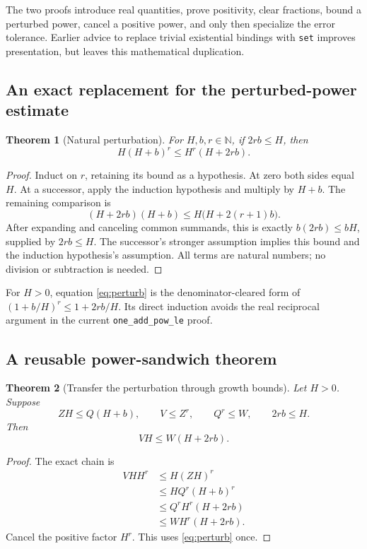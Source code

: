 \documentclass[11pt,a4paper]{article}
\newcommand{\N}{\mathbb N}
\newcommand{\code}[1]{\nolinkurl{#1}}
\newtheorem{theorem}{Theorem}[section]
\begin{document}
The two proofs introduce real quantities, prove positivity, clear fractions,
bound a perturbed power, cancel a positive power, and only then specialize the
error tolerance. Earlier advice to replace trivial existential bindings with
\code{set} improves presentation, but leaves this mathematical duplication.

\subsection{An exact replacement for the perturbed-power estimate}

\begin{theorem}[Natural perturbation]
For \(H,b,r\in\N\), if \(2rb\le H\), then
\begin{equation}
 H(H+b)^r\le H^r(H+2rb).
 \label{eq:perturb}
\end{equation}
\end{theorem}
\begin{proof}
Induct on \(r\), retaining its bound as a hypothesis. At zero both sides equal
\(H\). At a successor, apply the induction hypothesis and multiply by \(H+b\).
The remaining comparison is
\[
 (H+2rb)(H+b)\le H\bigl(H+2(r+1)b\bigr).
\]
After expanding and canceling common summands, this is exactly
\(b(2rb)\le bH\), supplied by \(2rb\le H\). The successor's stronger
assumption implies this bound and the induction hypothesis's assumption.
All terms are natural numbers; no division or subtraction is needed.
\end{proof}

For \(H>0\), equation \eqref{eq:perturb} is the denominator-cleared form of
\((1+b/H)^r\le 1+2rb/H\). Its direct induction avoids the real reciprocal
argument in the current \code{one_add_pow_le} proof.

\subsection{A reusable power-sandwich theorem}

\begin{theorem}[Transfer the perturbation through growth bounds]
Let \(H>0\). Suppose
\[
 ZH\le Q(H+b),\qquad V\le Z^r,\qquad Q^r\le W,
 \qquad 2rb\le H.
\]
Then
\begin{equation}
 VH\le W(H+2rb).
 \label{eq:sandwich}
\end{equation}
\end{theorem}
\begin{proof}
The exact chain is
\begin{align*}
 VH H^r
 &\le H(ZH)^r\\
 &\le H Q^r(H+b)^r\\
 &\le Q^r H^r(H+2rb)\\
 &\le W H^r(H+2rb).
\end{align*}
Cancel the positive factor \(H^r\). This uses \eqref{eq:perturb} once.
\end{proof}
\end{document}
